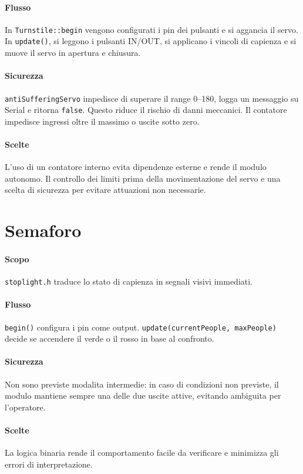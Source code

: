 \paragraph{Flusso} In \texttt{Turnstile::begin} vengono configurati i pin dei pulsanti e si aggancia il servo. In \texttt{update()}, si leggono i pulsanti IN/OUT, si applicano i vincoli di capienza e si muove il servo in apertura e chiusura.

\paragraph{Sicurezza} \texttt{antiSufferingServo} impedisce di superare il range 0--180, logga un messaggio su Serial e ritorna \texttt{false}. Questo riduce il rischio di danni meccanici. Il contatore impedisce ingressi oltre il massimo o uscite sotto zero.

\paragraph{Scelte} L'uso di un contatore interno evita dipendenze esterne e rende il modulo autonomo. Il controllo dei limiti prima della movimentazione del servo e una scelta di sicurezza per evitare attuazioni non necessarie.

\section{Semaforo}
\paragraph{Scopo} \texttt{stoplight.h} traduce lo stato di capienza in segnali visivi immediati.

\paragraph{Flusso} \texttt{begin()} configura i pin come output. \texttt{update(currentPeople, maxPeople)} decide se accendere il verde o il rosso in base al confronto.

\paragraph{Sicurezza} Non sono previste modalita intermedie: in caso di condizioni non previste, il modulo mantiene sempre una delle due uscite attive, evitando ambiguita per l'operatore.

\paragraph{Scelte} La logica binaria rende il comportamento facile da verificare e minimizza gli errori di interpretazione.

